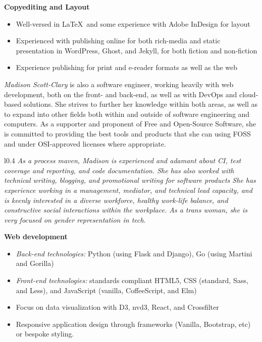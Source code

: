 \documentclass[letterpaper]{memoir}
\begin{document}
\hspace{-1.5em}\textbf{Copyediting and Layout}

\begin{itemize}
  \item Well-versed in \LaTeX\ and some experience with Adobe InDesign for layout
  \item Experienced with publishing online for both rich-media and static presentation in WordPress, Ghost, and Jekyll, for both fiction and non-fiction
  \item Experience publishing for print and e-reader formats as well as the web
\end{itemize}

\newpage

\textit{\large Madison Scott-Clary} is also a software engineer, working heavily with web development, both on the front- and back-end, as well as with DevOps and cloud-based solutions. She strives to further her knowledge within both areas, as well as to expand into other fields both within and outside of software engineering and computers. As a supporter and proponent of Free and Open-Source Software, she is committed to providing the best tools and products that she can using FOSS and under OSI-approved licenses where appropriate.

\begin{wrapfigure}{l}{0.4\linewidth}
  \textit{\color{titlegreydark} \large As a process maven, Madison is experienced and adamant about CI, test coverage and reporting, and code documentation. She has also worked with technical writing, blogging, and promotional writing for software products She has experience working in a management, mediator, and technical lead capacity, and is keenly interested in a diverse workforce, healthy work-life balance, and constructive social interactions within the workplace. As a trans woman, she is very focused on gender representation in tech.}
  \vspace{-0.7in}
\end{wrapfigure}

\textbf{Web development}

\begin{itemize}
  \item \textit{Back-end technologies:} Python (using Flask and Django), Go (using Martini and Gorilla)
  \item \textit{Front-end technologies:} standards compliant HTML5, CSS (standard, Sass, and Less), and JavaScript (vanilla, CoffeeScript, and Elm)
  \item Focus on data visualization with D3, nvd3, React, and Crossfilter
  \item Responsive application design through frameworks (Vanilla, Bootstrap, etc) or bespoke styling.
\end{itemize}
\end{document}
